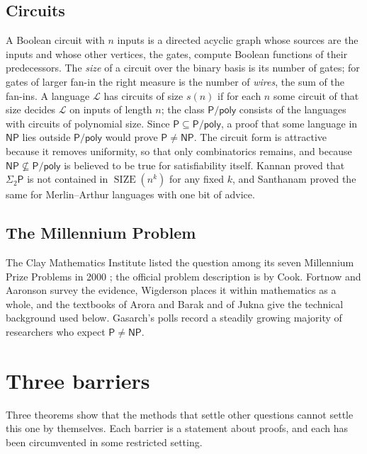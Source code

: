 \documentclass[11pt,reqno]{amsart}
\numberwithin{equation}{section}
\theoremstyle{plain}
\theoremstyle{definition}
\theoremstyle{remark}
\DeclareMathOperator{\SIZE}{SIZE}
\newcommand{\Pc}{\mathsf{P}}
\newcommand{\NP}{\mathsf{NP}}
\newcommand{\Ppoly}{\mathsf{P}/\mathsf{poly}}
\begin{document}
\subsection{Circuits}
A Boolean circuit with $n$ inputs is a directed acyclic graph whose sources are
the inputs and whose other vertices, the gates, compute Boolean functions of
their predecessors. The \emph{size} of a circuit over the binary basis is its
number of gates; for gates of larger fan-in the right measure is the number of
\emph{wires}, the sum of the fan-ins. A language $\mathcal L$ has circuits of
size $s(n)$ if for each $n$ some circuit of that size decides $\mathcal L$ on
inputs of length $n$; the class $\Ppoly$ consists of the languages with
circuits of polynomial size. Since $\Pc\subseteq\Ppoly$, a proof that some
language in $\NP$ lies outside $\Ppoly$ would prove $\Pc\ne\NP$. The circuit
form is attractive because it removes uniformity, so that only combinatorics
remains, and because $\NP\not\subseteq\Ppoly$ is believed to be true for
satisfiability itself. Kannan \cite{Kan82} proved that $\Sigma_2\Pc$ is not
contained in $\SIZE(n^k)$ for any fixed $k$, and Santhanam \cite{San09}
proved the same for Merlin--Arthur languages with one bit of advice.

\subsection{The Millennium Problem}
The Clay Mathematics Institute listed the question among its seven Millennium
Prize Problems in 2000 \cite{Clay}; the official problem description is by
Cook. Fortnow \cite{For09} and Aaronson \cite{Aar16} survey the evidence,
Wigderson \cite{Wig19} places it within mathematics as a whole, and the
textbooks of Arora and Barak \cite{AB09} and of Jukna \cite{Juk12} give the
technical background used below. Gasarch's polls \cite{Gas19} record a
steadily growing majority of researchers who expect $\Pc\ne\NP$.

\section{Three barriers}\label{sec:barriers}

Three theorems show that the methods that settle other questions cannot settle
this one by themselves. Each barrier is a statement about proofs, and each has
been circumvented in some restricted setting.
\end{document}
